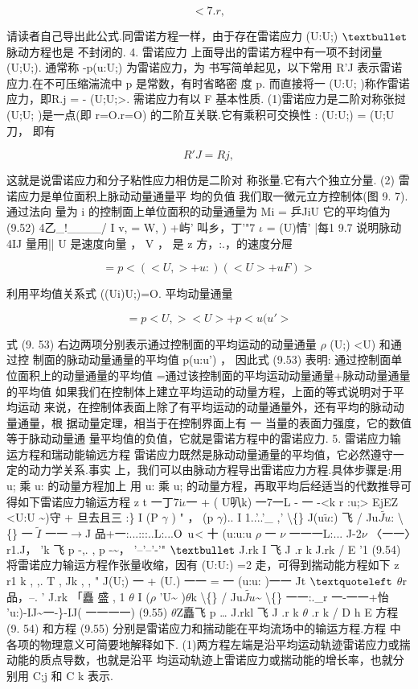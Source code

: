 \begin{equation*}<7.r,\tag{9.51b}\end{equation*}

请读者自己导出此公式.同雷诺方程一样，由于存在雷诺应力 (U:U;) ${\rm •}$ 脉动方程也是 不封闭的. 4. 雷诺应力 上面导出的雷诺方程中有一项不封闭量 (U;U;). 通常称 -p(u:U;) 为雷诺应力，为 书写简单起见，以下常用 R'J 表示雷诺应力.在不可压缩湍流中 p 是常数，有时省略密 度 p. 而直接将一 (U:U; )称作雷诺应力，即R.j = - (U;U;>. 需诺应力有以 F 基本性质. (1)雷诺应力是二阶对称张挝 (U;U; )是一点(即 r=O.r=O) 的二阶互关联.它有乘积可交换性 : (U:U;) = (U;U 刀， 即有

\[R'J = Rj,\]

这就是说雷诺应力和分子粘性应力相仿是二阶对 称张量.它有六个独立分量. (2) 雷诺应力是单位面积上脉动动量通量平 均的负值 我们取一微元立方控制体(图 9. 7). 通过法向 量为 i 的控制面上单位面积的动量通量为 Mi = 乒JiU 它的平均值为 (9.52) 4乙\_!\_\_\_\_/ I v, = W, ) +屿' 叫乡，丁'"7 $\iota$ = (U)情' |每1 9.7 说明脉动 4IJ 量用|| U 是速度向量 ， V ， 是 z 方，:.，的速度分屉

\[<M,> =p<(<U,> +u:)( <U >+uF) >\]

利用平均值关系式 ((Ui)U;)=O. 平均动量通量

\begin{equation*}<Ma > =p<U,>< U > +p<u(u' >\tag{9.53}\end{equation*}

式 (9. 53) 右边两项分别表示通过控制面的平均运动的动量通量 $\rho$ (U;) <U) 和通过控 制面的脉动动量通量的平均值 p(u:u') ， 因此式 (9.53) 表明: 通过控制面单位面积上的动量通量的平均值 =通过该控制面的平均运动动量通量+脉动动量通量的平均值 如果我们在控制体上建立平均运动的动量方程，上面的等式说明对于平均运动 来说，在控制体表面上除了有平均运动的动量通量外，还有平均的脉动动量通量，根 据动量定理，相当于在控制界面上有 一 当量的表面力强度，它的数值等于脉动动量通 量平均值的负值，它就是雷诺方程中的雷诺应力. 5. 雷诺应力输运方程和瑞动能输远方程 雷诺应力既然是脉动动量通量的平均值，它必然遵守一定的动力学关系.事实 上，我们可以由脉动方程导出雷诺应力方程.具体步骤是:用 u; 乘 u: 的动量方程加上 用 u: 乘 u; 的动量方程，再取平均后经适当的代数推导可得如下雷诺应力输运方程 z t 一丁7i$\iota$一 + ( U叭k) 一7一L - 一 -<k r  :u;> EjEZ <U:U \textasciitilde{})守 + 旦去且三 :\} I (P $\gamma$ ) " ， (p $\gamma$).. I 1..'..'\_ ,' \textbackslash\{\} J(u$\tilde{u}$:) 飞 / Ju$\tilde{Ju}$: \textbackslash\{\} 一 $\tilde{I}$ 一一$\rightarrow$J 品+一:...:::..L:...${\rm O}$ ${\rm u}$< 十 (u:u:u $\rho$ 一 $\nu$ 一一一L:... J-2$\nu$ 〈一一〉r1.J， 'k 飞 p -,. , p -\textasciitilde{}， '--'--'-'" ${\rm •}$ J.rk I 飞 J .r k J.rk / E '1 (9.54) 将雷诺应力输运方程作张量收缩，因有 (U:U:) =2 走，可得到揣动能方程如下 z r1 k , ,. T , Jk , , " J(U;) 一 + (U.) 一一 = 一 (u:u: )一一 Jt ${\rm ‘}$ $\theta$r品，--. ' J.rk 「矗 盛 , 1 $\theta$ I ($\rho$ 'U\textasciitilde{} )$\theta$k \textbackslash\{\} / Ju$\tilde{Ju}$\textasciitilde{} \textbackslash\{\} 一一:.\_r 一-一一+怡 'u:)-IJ\textasciitilde{}一-\}-IJ( 一一一一) (9.55) $\theta$Z矗飞 p … J.rkl 飞 J .r k $\theta$ .r k / D h E 方程 (9. 54) 和方程 (9.55) 分别是雷诺应力和揣动能在平均流场中的输运方程.方程 中各项的物理意义可简要地解释如下. (1)两方程左端是沿平均运动轨迹雷诺应力或揣动能的质点导数，也就是沿平 均运动轨迹上雷诺应力或揣动能的增长率，也就分别用 C;j 和 C k 表示.


